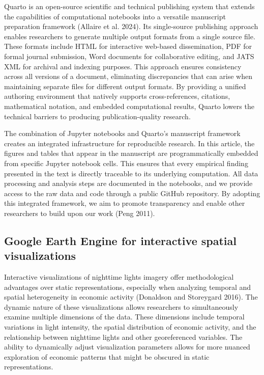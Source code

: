 \documentclass[
  letterpaper,
  DIV=11,
  numbers=noendperiod]{scrartcl}
\begin{document}
Quarto is an open-source scientific and technical publishing system that
extends the capabilities of computational notebooks into a versatile
manuscript preparation framework (Allaire et al. 2024). Its
single-source publishing approach enables researchers to generate
multiple output formats from a single source file. These formats include
HTML for interactive web-based dissemination, PDF for formal journal
submission, Word documents for collaborative editing, and JATS XML for
archival and indexing purposes. This approach ensures consistency across
all versions of a document, eliminating discrepancies that can arise
when maintaining separate files for different output formats. By
providing a unified authoring environment that natively supports
cross-references, citations, mathematical notation, and embedded
computational results, Quarto lowers the technical barriers to producing
publication-quality research.

The combination of Jupyter notebooks and Quarto's manuscript framework
creates an integrated infrastructure for reproducible research. In this
article, the figures and tables that appear in the manuscript are
programmatically embedded from specific Jupyter notebook cells. This
ensures that every empirical finding presented in the text is directly
traceable to its underlying computation. All data processing and
analysis steps are documented in the notebooks, and we provide access to
the raw data and code through a public GitHub repository. By adopting
this integrated framework, we aim to promote transparency and enable
other researchers to build upon our work (Peng 2011).

\subsection{Google Earth Engine for interactive spatial
visualizations}\label{google-earth-engine-for-interactive-spatial-visualizations}

Interactive visualizations of nighttime lights imagery offer
methodological advantages over static representations, especially when
analyzing temporal and spatial heterogeneity in economic activity
(Donaldson and Storeygard 2016). The dynamic nature of these
visualizations allows researchers to simultaneously examine multiple
dimensions of the data. These dimensions include temporal variations in
light intensity, the spatial distribution of economic activity, and the
relationship between nighttime lights and other georeferenced variables.
The ability to dynamically adjust visualization parameters allows for
more nuanced exploration of economic patterns that might be obscured in
static representations.
\end{document}
